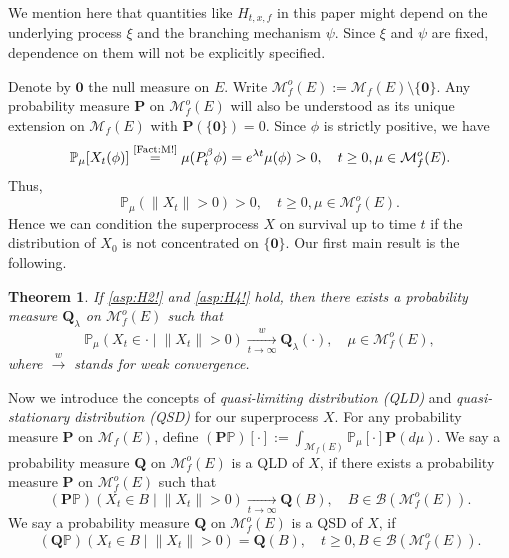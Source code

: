 \documentclass[12pt,a4paper]{amsart}
\numberwithin{equation}{section}
\theoremstyle{plain}
\newtheorem{thm}{Theorem}[section]
\theoremstyle{definition}
\theoremstyle{remark}
\begin{document}
    We  mention here that quantities like $H_{t,x,f}$ in this paper might depend on the underlying process $\xi$ and the branching mechanism $\psi$.
    Since $\xi$ and $\psi$ are fixed, dependence on them will not be explicitly specified.

	Denote by $\mathbf 0$ the null measure on $E$.
	Write $\mathcal M_f^o(E) := \mathcal M_f(E)\setminus \{ \mathbf 0\}$.
	Any probability measure $\mathbf P$ on $\mathcal M_f^o(E)$ will also be understood as its unique extension on $\mathcal M_f(E)$ with  $\mathbf P(\{\mathbf
    0\}) = 0$.
	Since $\phi$ is strictly positive, we have
\begin{equation}
	\mathbb P_\mu[X_t(\phi)]
	\overset{\text{\eqref{Fact:M!}}}= \mu(P_t^\beta \phi)
	=e^{\lambda t}\mu(\phi)>0, \quad t\geq 0, \mu \in \mathcal M_f^o(E).
\end{equation}
	Thus,
\begin{equation}  \label{lem:Nd!}
		\mathbb P_\mu(\|X_t\| > 0) > 0,\quad t\geq 0,\mu \in \mathcal M_f^o(E).
\end{equation}
   Hence we can condition the superprocess $X$ on survival up to time $t$ if  the distribution of $X_0$ is not concentrated on $\{\mathbf 0\}$.
	Our first main result is the following.
	
\begin{thm} \label{Theorem:Y:H1:H2:H3:H4}
	If \eqref{asp:H2!} and \eqref{asp:H4!} hold, then there exists a probability measure $\mathbf Q_\lambda$
	on $\mathcal M_f^o(E)$ such that
\begin{equation}
 	\mathbb P_\mu \left(X_t \in \cdot \middle| \|X_t\| > 0 \right) \xrightarrow[t\to \infty]{w} \mathbf Q_\lambda(\cdot),
 	\quad \mu \in \mathcal M_f^o(E),
\end{equation}
	where $\xrightarrow{w}$ stands for weak convergence.
\end{thm}

	Now we introduce the concepts of \emph{quasi-limiting distribution (QLD)} and \emph{quasi-stationary distribution (QSD)} for our superprocess $X$.
	For any probability measure $\mathbf P$ on $\mathcal M_f(E)$, define $(\mathbf P\mathbb P)[\cdot] := \int_{\mathcal M_f(E)} \mathbb P_\mu[\cdot] \mathbf
    P(d\mu)$.
	We say a probability measure $\mathbf Q$ on $\mathcal M^o_f(E)$ is a QLD of $X$, if there exists a probability measure $\mathbf P$ on
	$\mathcal M_f^o(E)$ such that
\[
	(\mathbf P\mathbb P)\left(X_t \in B \middle| \|X_t\|>0\right) \xrightarrow[t\to \infty]{} \mathbf Q(B),
	\quad B\in \mathcal B(\mathcal M^o_f(E)).
\]
	We say a probability measure $\mathbf Q$ on $\mathcal M^o_f(E)$ is a QSD of $X$, if
\[
	(\mathbf Q \mathbb P) \left( X_t \in B \middle | \|X_t\|>0 \right) = \mathbf Q(B),
	\quad t\geq 0, B \in \mathcal B(\mathcal M^o_f(E)).
\]
	
\end{document}
